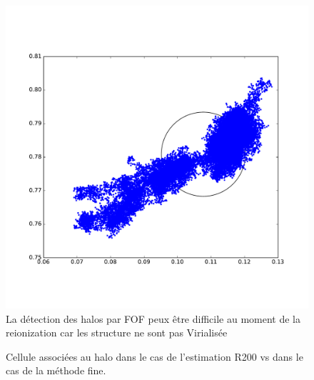 \begin{figure}[bth]
        \includegraphics[width=.95\textwidth]{img/03/part_halo_R200.pdf} 
        \caption{La détection des halos par FOF peux être difficile au moment de la reionization car les structure ne sont pas Virialisée
        }
 		\label{fig:part_halo}
\end{figure}

\begin{figure}[bth]
        \caption{Cellule associées au halo dans le cas de l'estimation R200 vs dans le cas de la méthode fine.
        }
 		\label{fig:part_halo}
\end{figure}




